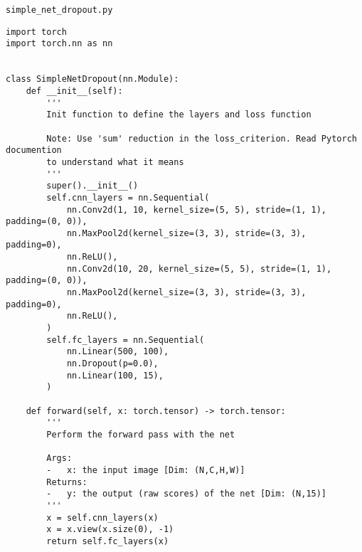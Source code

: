 \texttt{simple\_net\_dropout.py}
\begin{lstlisting}[style=Python]
import torch
import torch.nn as nn


class SimpleNetDropout(nn.Module):
    def __init__(self):
        '''
        Init function to define the layers and loss function

        Note: Use 'sum' reduction in the loss_criterion. Read Pytorch documention
        to understand what it means
        '''
        super().__init__()
        self.cnn_layers = nn.Sequential(
            nn.Conv2d(1, 10, kernel_size=(5, 5), stride=(1, 1), padding=(0, 0)),
            nn.MaxPool2d(kernel_size=(3, 3), stride=(3, 3), padding=0),
            nn.ReLU(),
            nn.Conv2d(10, 20, kernel_size=(5, 5), stride=(1, 1), padding=(0, 0)),
            nn.MaxPool2d(kernel_size=(3, 3), stride=(3, 3), padding=0),
            nn.ReLU(),
        )
        self.fc_layers = nn.Sequential(
            nn.Linear(500, 100),
            nn.Dropout(p=0.0),
            nn.Linear(100, 15),
        )

    def forward(self, x: torch.tensor) -> torch.tensor:
        '''
        Perform the forward pass with the net

        Args:
        -   x: the input image [Dim: (N,C,H,W)]
        Returns:
        -   y: the output (raw scores) of the net [Dim: (N,15)]
        '''
        x = self.cnn_layers(x)
        x = x.view(x.size(0), -1)
        return self.fc_layers(x)
\end{lstlisting}